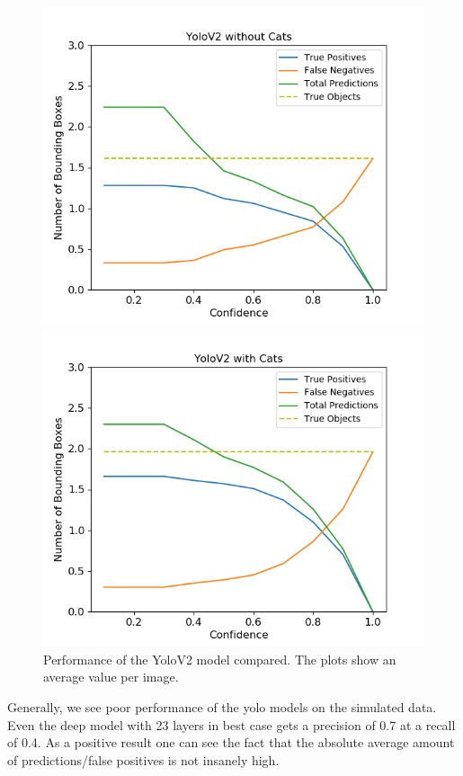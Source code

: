 \documentclass{article}
\begin{document}
\begin{figure}
\begin{minipage}{0.4\textwidth}
		\includegraphics[width=\textwidth]{fig/detections_v2}
	\end{minipage}
	\begin{minipage}{0.4\textwidth}
		\includegraphics[width=\textwidth]{fig/detections_v2_cats}
	\end{minipage}
		\caption{Performance of the YoloV2 model compared. The plots show an average value per image.}
			\label{fig:v2}
\end{figure} 

Generally, we see poor performance of the yolo models on the simulated data. Even the deep model with 23 layers in best case gets a precision of 0.7 at a recall of 0.4. As a positive result one can see the fact that the absolute average amount of predictions/false positives is not insanely high. 
\end{document}
